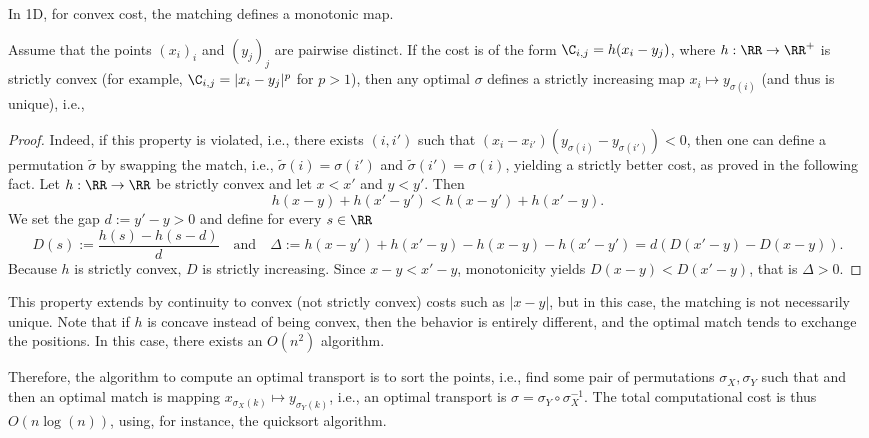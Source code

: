 In 1D, for convex cost, the matching defines a monotonic map.

\begin{proposition}\label{prop-matching-1d-monotone}
Assume that the points $(x_i)_i$ and $(y_j)_j$ are pairwise distinct. If the cost is of the form $\C_{i,j}=h(x_i-y_j)$, where $h: \RR \rightarrow \RR^+$ is strictly convex (for example, $\C_{i,j}=|x_i-y_j|^p$ for $p > 1$), then any optimal $\sigma$ defines a strictly increasing map $x_i \mapsto y_{\sigma(i)}$ (and thus is unique), i.e.,
\end{proposition}
\begin{proof}
Indeed, if this property is violated, i.e., there exists $(i,i')$ such that $(x_i-x_{i'})(y_{\sigma(i)}-y_{\sigma(i')}) < 0$, then one can define a permutation $\tilde{\sigma}$ by swapping the match, i.e., $\tilde{\sigma}(i)=\sigma(i')$ and $\tilde{\sigma}(i')=\sigma(i)$, yielding a strictly better cost, as proved in the following fact.
%
Let $h:\RR\to\RR$ be strictly convex and let $x < x'$ and $y < y'$. Then
\[
  h(x-y)+h(x'-y') < h(x-y')+h(x'-y).
\]
We set the gap $d:=y'-y > 0$ and define for every $s\in\RR$
\[
	  D(s):=\frac{h(s)-h(s-d)}{d}
	\quad\text{and}\quad
	\Delta:=h(x-y')+h(x'-y)-h(x-y)-h(x'-y') = d ( D(x'-y)-D(x-y) ).
\]
Because $h$ is strictly convex, $D$ is strictly increasing.
Since $x-y < x'-y$, monotonicity yields $D(x-y) < D(x'-y)$, that is $\Delta > 0$.
\end{proof}

This property extends by continuity to convex (not strictly convex) costs such as $|x-y|$, but in this case, the matching is not necessarily unique.
Note that if $h$ is concave instead of being convex, then the behavior is entirely different, and the optimal match tends to exchange the positions. In this case, there exists an $O(n^2)$ algorithm.

Therefore, the algorithm to compute an optimal transport is to sort the points, i.e., find some pair of permutations $\sigma_X, \sigma_Y$ such that
and then an optimal match is mapping $x_{\sigma_X(k)} \mapsto y_{\sigma_Y(k)}$, i.e., an optimal transport is $\sigma = \sigma_Y \circ \sigma_X^{-1}$. The total computational cost is thus $O(n\log(n))$, using, for instance, the quicksort algorithm.


